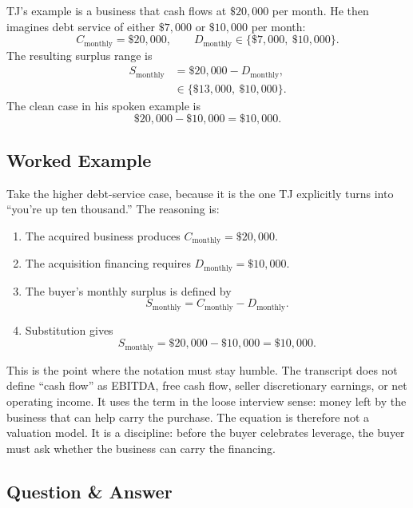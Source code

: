 TJ's example is a business that cash flows at \(\$20{,}000\) per month. He then imagines debt service of either \(\$7{,}000\) or \(\$10{,}000\) per month:
\begin{equation}
C_{\mathrm{monthly}}=\$20{,}000,
\qquad
D_{\mathrm{monthly}}\in\{\$7{,}000,\ \$10{,}000\}.
\end{equation}
The resulting surplus range is
\begin{align}
S_{\mathrm{monthly}}
  &= \$20{,}000-D_{\mathrm{monthly}},\\
  &\in \{\$13{,}000,\ \$10{,}000\}.
\end{align}
The clean case in his spoken example is
\begin{equation}
\$20{,}000-\$10{,}000=\$10{,}000.
\end{equation}

\subsection{Worked Example}

Take the higher debt-service case, because it is the one TJ explicitly turns into ``you're up ten thousand.'' The reasoning is:
\begin{enumerate}
\item The acquired business produces \(C_{\mathrm{monthly}}=\$20{,}000\).
\item The acquisition financing requires \(D_{\mathrm{monthly}}=\$10{,}000\).
\item The buyer's monthly surplus is defined by
\[
S_{\mathrm{monthly}}=C_{\mathrm{monthly}}-D_{\mathrm{monthly}}.
\]
\item Substitution gives
\[
S_{\mathrm{monthly}}=\$20{,}000-\$10{,}000=\$10{,}000.
\]
\end{enumerate}

This is the point where the notation must stay humble. The transcript does not define ``cash flow'' as EBITDA, free cash flow, seller discretionary earnings, or net operating income. It uses the term in the loose interview sense: money left by the business that can help carry the purchase. The equation is therefore not a valuation model. It is a discipline: before the buyer celebrates leverage, the buyer must ask whether the business can carry the financing.

\subsection{Question \& Answer}


